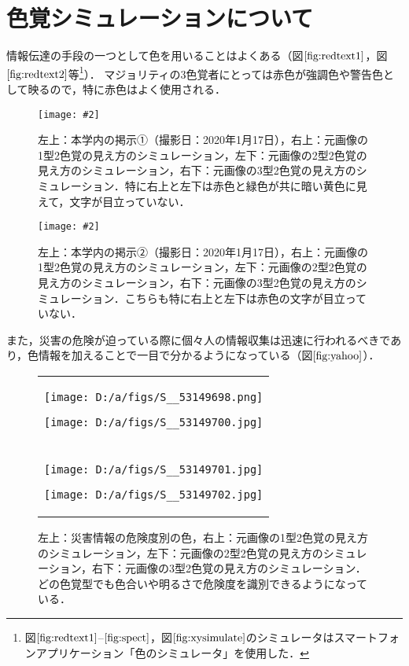 \documentclass[uplatex,paper=a4,fontsize=4.0truemm,jafontsize=4.0truemm,head_space=30.0truemm,foot_space=30.0truemm,baselineskip=8.0truemm,line_length=40zw,gutter=25.0truemm,oneside,openany,fleqn,hanging_panctuation,open_bracket_pos=nibu_tentsuki,dvipdfmx,jis2004,book,titlepage]{jlreq}
\theoremstyle{mystyle}
\newcommand{\captiondot}[1]{\caption{#1．}}
\newcommand{\figureinput}[4]{\begin{figure}[btp]\centering\texttt{[image: \#2]}\captiondot{#3}\label{fig:#4}\end{figure}}
\newcommand{\mathdisplaystyle}[1]{\(\displaystyle{#1}\)}
\newcommand{\Reference}[1]{\mathdisplaystyle{\ref{#1}}}
\begin{document}
		\section{色覚シミュレーションについて}
			情報伝達の手段の一つとして色を用いることはよくある（図\Reference{fig:redtext1}，図\Reference{fig:redtext2}等\footnote{図\Reference{fig:redtext1}--\protect\Reference{fig:spect}，図\Reference{fig:xysimulate}のシミュレータはスマートフォンアプリケーション「色のシミュレータ」を使用した．}）．
			マジョリティの3色覚者にとっては赤色が強調色や警告色として映るので，特に赤色はよく使用される．
			\figureinput{width=7.5truecm}{D:/a/figs/S__50315266.jpg}{左上：本学内の掲示①（撮影日：2020年1月17日），右上：元画像の1型2色覚の見え方のシミュレーション，左下：元画像の2型2色覚の見え方のシミュレーション，右下：元画像の3型2色覚の見え方のシミュレーション．特に右上と左下は赤色と緑色が共に暗い黄色に見えて，文字が目立っていない}{redtext1}
			\figureinput{width=7.5truecm}{D:/a/figs/S__50315270.jpg}{左上：本学内の掲示②（撮影日：2020年1月17日），右上：元画像の1型2色覚の見え方のシミュレーション，左下：元画像の2型2色覚の見え方のシミュレーション，右下：元画像の3型2色覚の見え方のシミュレーション．こちらも特に右上と左下は赤色の文字が目立っていない}{redtext2}
			また，災害の危険が迫っている際に個々人の情報収集は迅速に行われるべきであり，色情報を加えることで一目で分かるようになっている（図\Reference{fig:yahoo}\cite{Yahoo2020}）．
			\begin{figure}[tbp]
				\centering
				\begin{tabular}{c}
					\begin{minipage}{0.5\linewidth}
						\centering
						\texttt{[image: D:/a/figs/S\_\_53149698.png]}
					\end{minipage}
					\begin{minipage}{0.5\linewidth}
						\centering
						\texttt{[image: D:/a/figs/S\_\_53149700.jpg]}
					\end{minipage} \\
					\begin{minipage}{0.06\linewidth}
						\vspace{10truemm}
					\end{minipage} \\
					\begin{minipage}{0.5\linewidth}
						\centering
						\texttt{[image: D:/a/figs/S\_\_53149701.jpg]}
					\end{minipage}
					\begin{minipage}{0.5\linewidth}
						\centering
						\texttt{[image: D:/a/figs/S\_\_53149702.jpg]}
					\end{minipage}
				\end{tabular}
				\captiondot{左上：災害情報の危険度別の色，右上：元画像の1型2色覚の見え方のシミュレーション，左下：元画像の2型2色覚の見え方のシミュレーション，右下：元画像の3型2色覚の見え方のシミュレーション．どの色覚型でも色合いや明るさで危険度を識別できるようになっている}\label{fig:yahoo}
			\end{figure}
\end{document}

